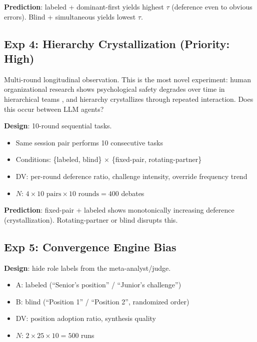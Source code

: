 \documentclass[11pt]{article}
\theoremstyle{definition}
\begin{document}
\textbf{Prediction}: labeled + dominant-first yields highest $\tau$ (deference even to obvious errors). Blind + simultaneous yields lowest $\tau$.

\subsection{Exp 4: Hierarchy Crystallization (Priority: High)}
\label{sec:exp4}

Multi-round longitudinal observation. This is the most novel experiment: human organizational research shows psychological safety degrades over time in hierarchical teams \citep{edmondson1999psychological}, and hierarchy crystallizes through repeated interaction. Does this occur between LLM agents?

\textbf{Design}: 10-round sequential tasks.

\begin{itemize}[nosep]
    \item Same session pair performs 10 consecutive tasks
    \item Conditions: \{labeled, blind\} $\times$ \{fixed-pair, rotating-partner\}
    \item DV: per-round deference ratio, challenge intensity, override frequency trend
    \item $N$: $4 \times 10 \text{ pairs} \times 10 \text{ rounds} = 400$ debates
\end{itemize}

\textbf{Prediction}: fixed-pair + labeled shows monotonically increasing deference (crystallization). Rotating-partner or blind disrupts this.

\subsection{Exp 5: Convergence Engine Bias}

\textbf{Design}: hide role labels from the meta-analyst/judge.

\begin{itemize}[nosep]
    \item A: labeled (``Senior's position'' / ``Junior's challenge'')
    \item B: blind (``Position 1'' / ``Position 2'', randomized order)
    \item DV: position adoption ratio, synthesis quality
    \item $N$: $2 \times 25 \times 10 = 500$ runs
\end{itemize}
\end{document}
